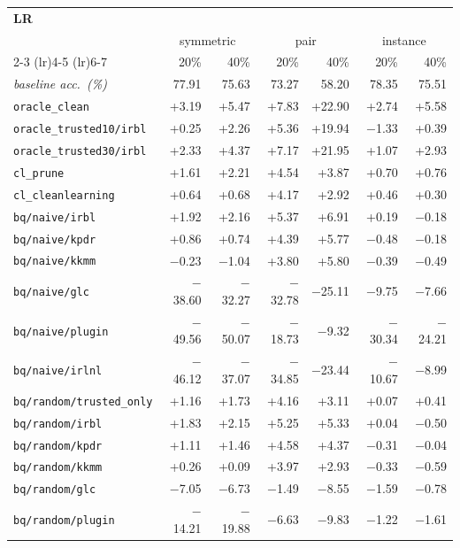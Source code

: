 \begin{tabular}{lrrrrrr}
\toprule
\multicolumn{7}{l}{\textbf{LR}} \\
 & \multicolumn{2}{c}{symmetric} & \multicolumn{2}{c}{pair} & \multicolumn{2}{c}{instance} \\
\cmidrule(lr){2-3} \cmidrule(lr){4-5} \cmidrule(lr){6-7}
 & 20\% & 40\% & 20\% & 40\% & 20\% & 40\% \\
\midrule
\textit{baseline acc.\ (\%)} & 77.91 & 75.63 & 73.27 & 58.20 & 78.35 & 75.51 \\
\addlinespace
\texttt{oracle\_clean} & +3.19 & +5.47 & +7.83 & +22.90 & +2.74 & +5.58 \\
\texttt{oracle\_trusted10/irbl} & +0.25 & +2.26 & +5.36 & +19.94 & $-$1.33 & +0.39 \\
\texttt{oracle\_trusted30/irbl} & +2.33 & +4.37 & +7.17 & +21.95 & +1.07 & +2.93 \\
\texttt{cl\_prune} & +1.61 & +2.21 & +4.54 & +3.87 & +0.70 & +0.76 \\
\texttt{cl\_cleanlearning} & +0.64 & +0.68 & +4.17 & +2.92 & +0.46 & +0.30 \\
\texttt{bq/naive/irbl} & +1.92 & +2.16 & +5.37 & +6.91 & +0.19 & $-$0.18 \\
\texttt{bq/naive/kpdr} & +0.86 & +0.74 & +4.39 & +5.77 & $-$0.48 & $-$0.18 \\
\texttt{bq/naive/kkmm} & $-$0.23 & $-$1.04 & +3.80 & +5.80 & $-$0.39 & $-$0.49 \\
\texttt{bq/naive/glc} & $-$38.60 & $-$32.27 & $-$32.78 & $-$25.11 & $-$9.75 & $-$7.66 \\
\texttt{bq/naive/plugin} & $-$49.56 & $-$50.07 & $-$18.73 & $-$9.32 & $-$30.34 & $-$24.21 \\
\texttt{bq/naive/irlnl} & $-$46.12 & $-$37.07 & $-$34.85 & $-$23.44 & $-$10.67 & $-$8.99 \\
\texttt{bq/random/trusted\_only} & +1.16 & +1.73 & +4.16 & +3.11 & +0.07 & +0.41 \\
\texttt{bq/random/irbl} & +1.83 & +2.15 & +5.25 & +5.33 & +0.04 & $-$0.50 \\
\texttt{bq/random/kpdr} & +1.11 & +1.46 & +4.58 & +4.37 & $-$0.31 & $-$0.04 \\
\texttt{bq/random/kkmm} & +0.26 & +0.09 & +3.97 & +2.93 & $-$0.33 & $-$0.59 \\
\texttt{bq/random/glc} & $-$7.05 & $-$6.73 & $-$1.49 & $-$8.55 & $-$1.59 & $-$0.78 \\
\texttt{bq/random/plugin} & $-$14.21 & $-$19.88 & $-$6.63 & $-$9.83 & $-$1.22 & $-$1.61 \\

\end{tabular}
